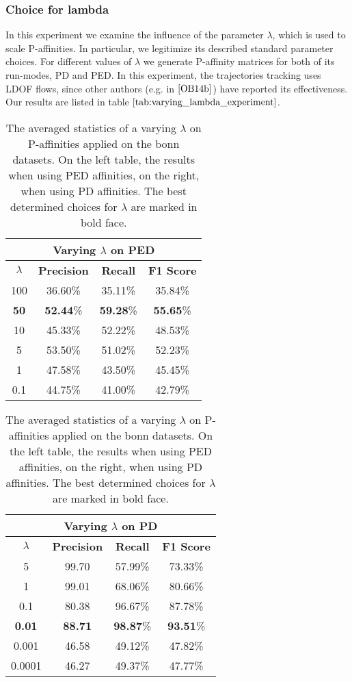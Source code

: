 \subsubsection{Choice for lambda}
In this experiment we examine the influence of the parameter $\lambda$, which is used to scale P-affinities. In particular, we legitimize its described standard parameter choices. For different values of $\lambda$ we generate P-affinity matrices for both of its run-modes, PD and PED. In this experiment, the trajectories tracking uses LDOF flows, since other authors (e.g. in $\cite{OB14b}$) have reported its effectiveness. Our results are listed in table $\ref{tab:varying_lambda_experiment}$.
\begin{table}[H]
\centering
\setlength\tabcolsep{4pt}
\begin{minipage}{0.48\textwidth}
\centering
\begin{tabular}{|c|c|c|c|}
\hline
\multicolumn{4}{|c|}{Varying $\lambda$ on PED}                        \\ \hline
$\lambda$ & \textbf{Precision} & \textbf{Recall} & \textbf{F1 Score} \\ \hline
100 & 36.60\% & 35.11\% & 35.84\%  \\ \hline
\textbf{50} & \textbf{52.44}\% & \textbf{59.28}\% & \textbf{55.65}\%  \\ \hline
10 & 45.33\% & 52.22\% & 48.53\%  \\ \hline
5 & 53.50\% & 51.02\% & 52.23\%  \\ \hline
1 & 47.58\% & 43.50\% & 45.45\%  \\ \hline
0.1 & 44.75\% & 41.00\% & 42.79\%  \\ \hline
\end{tabular}
\end{minipage}%
\hfill
\begin{minipage}{0.48\textwidth}
\centering
\begin{tabular}{|c|c|c|c|}
\hline
\multicolumn{4}{|c|}{Varying $\lambda$ on PD} \\ \hline
$\lambda$ & \textbf{Precision} & \textbf{Recall} & \textbf{F1 Score} \\ \hline
5 & 99.70 & 57.99\% & 73.33\%  \\ \hline
1 & 99.01 & 68.06\% & 80.66\%  \\ \hline
0.1 & 80.38 & 96.67\% & 87.78\%  \\ \hline
\textbf{0.01} & \textbf{88.71} & \textbf{98.87}\% & \textbf{93.51}\%  \\ \hline
0.001 & 46.58 & 49.12\% & 47.82\%  \\ \hline
0.0001 & 46.27 & 49.37\% & 47.77\%  \\ \hline
\end{tabular}
\end{minipage}
\caption[Experiment Varying $\lambda$]{The averaged statistics of a varying $\lambda$ on P-affinities applied on the bonn datasets. On the left table, the results when using PED affinities, on the right, when using PD affinities. The best determined choices for $\lambda$ are marked in bold face.}
\label{tab:varying_lambda_experiment}
\end{table}
